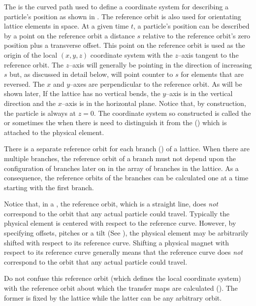 The  is the curved path used to define a
coordinate system for describing a particle's position as shown in
. The reference orbit is also used for orientating
lattice elements in space. At a given time $t$, a particle's position
can be described by a point on the reference orbit a distance $s$
relative to the reference orbit's zero position plus a transverse
offset. This point on the reference orbit is used as the origin of the
local $(x, y, z)$ coordinate system with the $z$--axis tangent to the
reference orbit. The $z$--axis will generally be pointing in the
direction of increasing $s$ but, as discussed in detail below, will
point counter to $s$ for elements that are reversed. The $x$ and
$y$--axes are perpendicular to the reference orbit. As will be shown
later, If the lattice has no vertical bends, the $y$--axis is in the
vertical direction and the $x$--axis is in the horizontal
plane. Notice that, by construction, the particle is always at $z =
0$. The coordinate system so constructed is called the  or sometimes the  when there is need to distinguish it from the  () which is attached to
the physical element.

There is a separate reference orbit for each branch
() of a lattice. When there are multiple branches,
the reference orbit of a branch must not depend upon the configuration
of branches later on in the array of branches in the lattice. As a
consequence, the reference orbits of the branches can be calculated
one at a time starting with the first branch.

Notice that, in a , the reference orbit, which is a
straight line, does {\em not} correspond to the orbit that any actual
particle could travel. Typically the physical element is
centered with respect to the reference curve. However, by specifying offsets, 
pitches or a tilt (See ), the physical element may be
arbitrarily shifted with respect to its reference curve. Shifting a
physical magnet with respect to its reference curve generally means
that the reference curve does {\em not} correspond to the orbit that
any actual particle could travel.

Do not confuse this reference orbit (which defines the local
coordinate system) with the reference orbit about which the transfer
maps are calculated (). The former is fixed by the
lattice while the latter can be any arbitrary orbit.

